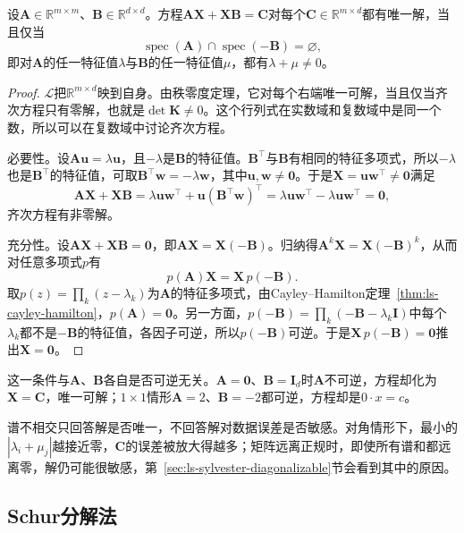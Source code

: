 \begin{theorem}[Sylvester方程的唯一可解性]
\label{thm:ls-sylvester-unique-solvability}
设$\bm A\in\mathbb R^{m\times m}$、$\bm B\in\mathbb R^{d\times d}$。方程$\bm A\bm X+\bm X\bm B=\bm C$对每个$\bm C\in\mathbb R^{m\times d}$都有唯一解，当且仅当
\begin{equation}
 \operatorname{spec}(\bm A)\cap\operatorname{spec}(-\bm B)=\varnothing ,
 \label{eq:ls-sylvester-spectral-separation}
\end{equation}
即对$\bm A$的任一特征值$\lambda$与$\bm B$的任一特征值$\mu$，都有$\lambda+\mu\neq0$。
\end{theorem}

\begin{proof}
$\mathcal L$把$\mathbb R^{m\times d}$映到自身。由秩零度定理，它对每个右端唯一可解，当且仅当齐次方程只有零解，也就是$\det\bm K\neq0$。这个行列式在实数域和复数域中是同一个数，所以可以在复数域中讨论齐次方程。

必要性。设$\bm A\bm u=\lambda\bm u$，且$-\lambda$是$\bm B$的特征值。$\bm B^\top$与$\bm B$有相同的特征多项式，所以$-\lambda$也是$\bm B^\top$的特征值，可取$\bm B^\top\bm w=-\lambda\bm w$，其中$\bm u,\bm w\neq\bm0$。于是$\bm X=\bm u\bm w^\top\neq\bm0$满足
\[
 \bm A\bm X+\bm X\bm B=\lambda\bm u\bm w^\top+\bm u(\bm B^\top\bm w)^\top=\lambda\bm u\bm w^\top-\lambda\bm u\bm w^\top=\bm0 ,
\]
齐次方程有非零解。

充分性。设$\bm A\bm X+\bm X\bm B=\bm0$，即$\bm A\bm X=\bm X(-\bm B)$。归纳得$\bm A^k\bm X=\bm X(-\bm B)^k$，从而对任意多项式$p$有
\[
 p(\bm A)\bm X=\bm X\,p(-\bm B) .
\]
取$p(z)=\prod_k(z-\lambda_k)$为$\bm A$的特征多项式，由Cayley--Hamilton定理~\ref{thm:ls-cayley-hamilton}，$p(\bm A)=\bm0$。另一方面，$p(-\bm B)=\prod_k(-\bm B-\lambda_k\bm I)$中每个$\lambda_k$都不是$-\bm B$的特征值，各因子可逆，所以$p(-\bm B)$可逆。于是$\bm X\,p(-\bm B)=\bm0$推出$\bm X=\bm0$。
\end{proof}

这一条件与$\bm A$、$\bm B$各自是否可逆无关。$\bm A=\bm0$、$\bm B=\bm I_d$时$\bm A$不可逆，方程却化为$\bm X=\bm C$，唯一可解；$1\times1$情形$\bm A=2$、$\bm B=-2$都可逆，方程却是$0\cdot x=c$。

谱不相交只回答解是否唯一，不回答解对数据误差是否敏感。对角情形下，最小的$|\lambda_i+\mu_j|$越接近零，$\bm C$的误差被放大得越多；矩阵远离正规时，即使所有谱和都远离零，解仍可能很敏感，第~\ref{sec:ls-sylvester-diagonalizable}节会看到其中的原因。

\subsection{Schur分解法}
\label{sec:ls-sylvester-schur}

